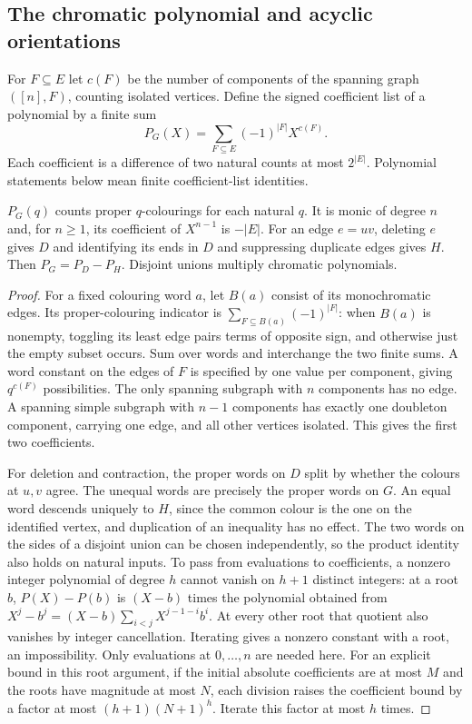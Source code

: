 \subsection{The chromatic polynomial and acyclic orientations}
For $F\subseteq E$ let $c(F)$ be the number of components of the spanning
graph $([n],F)$, counting isolated vertices. Define the signed coefficient
list of a polynomial by a finite sum
\[
 P_G(X)=\sum_{F\subseteq E}(-1)^{|F|}X^{c(F)}.
\]
Each coefficient is a difference of two natural counts at most $2^{|E|}$.
Polynomial statements below mean finite coefficient-list identities.

\begin{theorem}\leavevmode\label{co:poly}
$P_G(q)$ counts proper $q$-colourings for each natural $q$. It is monic
of degree $n$ and, for $n\ge1$, its coefficient of $X^{n-1}$ is $-|E|$.
For an edge $e=uv$, deleting $e$ gives $D$ and identifying its ends in $D$
and suppressing duplicate edges gives $H$. Then
$P_G=P_D-P_H$. Disjoint unions multiply chromatic polynomials.
\end{theorem}
\begin{proof}
For a fixed colouring word $a$, let $B(a)$ consist of its monochromatic
edges. Its proper-colouring indicator is
$\sum_{F\subseteq B(a)}(-1)^{|F|}$: when $B(a)$ is nonempty, toggling its
least edge pairs terms of opposite sign, and otherwise just the empty
subset occurs. Sum over words and interchange the two finite sums. A word
constant on the edges of $F$ is specified by one value per component,
giving $q^{c(F)}$ possibilities. The only spanning subgraph with $n$
components has no edge. A spanning simple subgraph with $n-1$ components
has exactly one doubleton component, carrying one edge, and all other
vertices isolated. This gives the first two coefficients.

For deletion and contraction, the proper words on $D$ split by whether the
colours at $u,v$ agree. The unequal words are precisely the proper words on
$G$. An equal word descends uniquely to $H$, since the common colour is the
one on the identified vertex, and duplication of an inequality has no
effect. The two words on the sides of a disjoint union can be chosen
independently, so the product identity also holds on natural inputs.
To pass from evaluations to coefficients, a nonzero integer polynomial of
degree $h$ cannot vanish on $h+1$ distinct integers: at a root $b$,
$P(X)-P(b)$ is $(X-b)$ times the polynomial obtained from
$X^j-b^j=(X-b)\sum_{i<j}X^{j-1-i}b^i$. At every other root that quotient
also vanishes by integer cancellation. Iterating gives a nonzero constant
with a root, an impossibility. Only evaluations at $0,\ldots,n$ are
needed here. For an explicit bound in this root argument, if the initial
absolute coefficients are at most $M$ and the roots have magnitude at most
$N$, each division raises the coefficient bound by a factor at most
$(h+1)(N+1)^h$. Iterate this factor at most $h$ times.
\end{proof}
